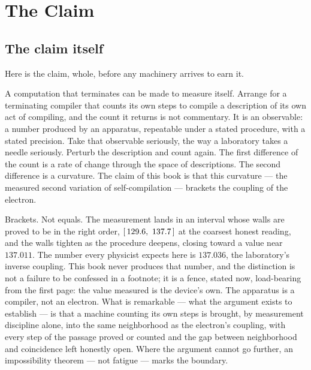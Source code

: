 \chapter{The Claim}

\section{The claim itself}

Here is the claim, whole, before any machinery arrives to earn it.

A computation that terminates can be made to measure itself. Arrange for a terminating
compiler that counts its own steps to compile a description of its own act of compiling,
and the count it returns is not commentary. It is an observable: a number produced by an
apparatus, repeatable under a stated procedure, with a stated precision. Take that
observable seriously, the way a laboratory takes a needle seriously. Perturb the
description and count again. The first difference of the count is a rate of change
through the space of descriptions. The second difference is a curvature. The claim of
this book is that this curvature --- the measured second variation of self-compilation
--- brackets the coupling of the electron.

Brackets. Not equals. The measurement lands in an interval whose walls are proved to be
in the right order, $\left[\,129.6,\ 137.7\,\right]$ at the coarsest honest reading, and the
walls tighten as the procedure deepens, closing toward a value near $137.011$. The
number every physicist expects here is $137.036$, the laboratory's inverse coupling.
This book never produces that number, and the distinction is not a failure to be
confessed in a footnote; it is a fence, stated now, load-bearing from the first page:
the value measured is the device's own. The apparatus is a compiler, not an electron.
What is remarkable --- what the argument exists to establish --- is that a machine
counting its own steps is brought, by measurement discipline alone, into the same
neighborhood as the electron's coupling, with every step of the passage proved or
counted and the gap between neighborhood and coincidence left honestly open. Where the
argument cannot go further, an impossibility theorem --- not fatigue --- marks the
boundary.

